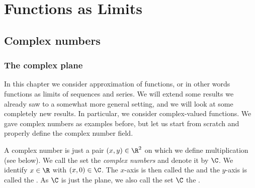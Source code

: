 
\chapter{Functions as Limits} \label{approx:chapter}


\section{Complex numbers}
\label{sec:complexnums}



\subsection{The complex plane}

In this chapter we consider approximation of functions, or in other words
functions as limits of sequences and series.
We will extend some results we already saw to a somewhat more
general setting, and we will look at some completely new results.
In particular, we consider complex-valued functions.
We gave complex numbers as examples before, but
let us start from scratch and properly define the complex number field.

A complex number is just a pair $(x,y) \in \R^2$ on which we define
multiplication (see below).
We call the set the \emph{complex numbers}
and denote it by $\C$.
We identify $x \in \R$ with $(x,0) \in \C$.
The $x$-axis is then called the \emph{} and the $y$-axis is
called the \emph{}.
As $\C$ is just the plane, we also call the set $\C$ the
\emph{}.


